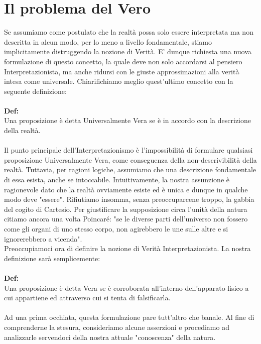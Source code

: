 \documentclass[]{article}
\begin{document}
	\section{Il problema del Vero}
	Se assumiamo come postulato che la realtà possa solo essere interpretata ma non descritta in alcun modo, per lo meno a livello fondamentale, stiamo implicitamente distruggendo la nozione di Verità. E' dunque richiesta  una nuova formulazione di questo concetto, la quale deve non solo accordarsi al pensiero Interpretazionista, ma anche ridursi con le giuste approssimazioni alla verità intesa come universale.
	Chiarifichiamo meglio quest'ultimo concetto con la seguente definizione:\\\\
	\textbf{Def:}\\
	Una proposizione è detta Universalmente Vera se è in accordo con la descrizione della realtà.\\
	\\
	Il punto principale dell'Interpretazionismo è l'impossibilità di formulare qualsiasi proposizione Universalmente Vera, come conseguenza della non-descrivibilità della realtà. Tuttavia, per ragioni logiche, assumiamo che una descrizione fondamentale di essa esista, anche se intoccabile. Intuitivamente, la nostra assunzione è ragionevole dato che la realtà ovviamente esiste ed è unica e dunque in qualche modo deve "essere". Rifiutiamo insomma, senza preoccuparcene troppo, la gabbia del cogito di Cartesio. Per giustificare la supposizione circa l'unità della natura citiamo ancora una volta Poincaré: "se le diverse parti dell'universo non fossero come gli organi di uno stesso corpo, non agirebbero le une sulle altre e si ignorerebbero a vicenda".\\
	Preoccupiamoci ora di definire la nozione di Verità Interpretazionista. La nostra definizione sarà semplicemente:\\
	\\
	\textbf{Def:}\\
	Una proposizione è detta Vera se è corroborata all'interno dell'apparato fisico a cui appartiene ed attraverso cui si tenta di falsificarla.\\
	\\
	Ad una prima occhiata, questa formulazione pare tutt'altro che banale. Al fine di comprenderne la stesura, consideriamo alcune asserzioni e procediamo ad analizzarle servendoci della nostra attuale "conoscenza" della natura.\\
\end{document}
